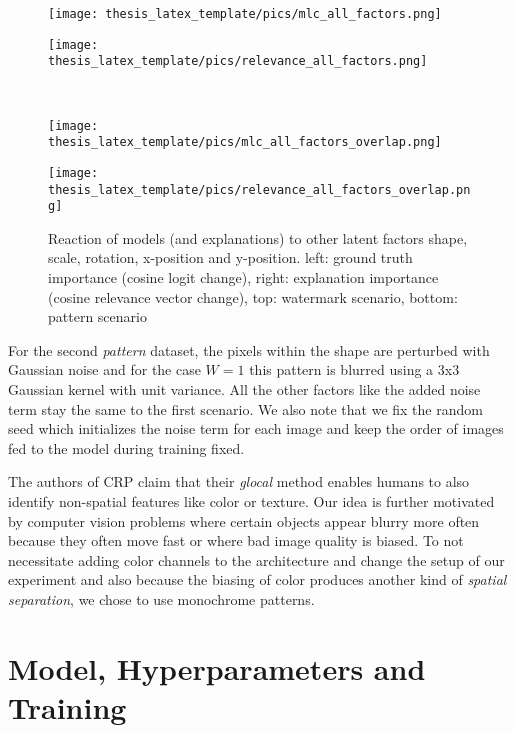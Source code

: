 \begin{figure}[ht!]
\advance\leftskip-0.2cm
\begin{minipage}[t]{0.42\textwidth}
    \texttt{[image: thesis\_latex\_template/pics/mlc\_all\_factors.png]}
\end{minipage}
\begin{minipage}[t]{0.49\textwidth}
    \texttt{[image: thesis\_latex\_template/pics/relevance\_all\_factors.png]}
\end{minipage}\\

\begin{minipage}[t]{0.42\textwidth}
    \texttt{[image: thesis\_latex\_template/pics/mlc\_all\_factors\_overlap.png]}
\end{minipage}
\begin{minipage}[t]{0.49\textwidth}
    \texttt{[image: thesis\_latex\_template/pics/relevance\_all\_factors\_overlap.png]}
\end{minipage}
\caption[Other Latent Factors Importance]{Reaction of models (and explanations) to other latent factors shape, scale, rotation, x-position and y-position. 
left: ground truth importance (cosine logit change),
right: explanation importance (cosine relevance vector change),
top: watermark scenario, bottom: pattern scenario }
\label{fig:other_latents_reaction}
\end{figure}

For the second \textit{pattern} dataset, the pixels within the shape are perturbed with Gaussian noise and for the case $W=1$ this pattern is blurred using a 3x3 Gaussian kernel with unit variance. All the other factors like the added noise term stay the same to the first scenario. We also note that we fix the random seed which initializes the noise term for each image and keep the order of images fed to the model during training fixed. 

The authors of CRP claim that their \textit{glocal} method enables humans to also identify non-spatial features like color or texture. Our idea is further motivated by computer vision problems where certain objects appear blurry more often because they often move fast or where bad image quality is biased.
To not necessitate adding color channels to the architecture and change the setup of our experiment and also because the biasing of color produces another kind of \textit{spatial separation}, we chose to use monochrome patterns.

\section{Model, Hyperparameters and Training}\label{appendix:model}
